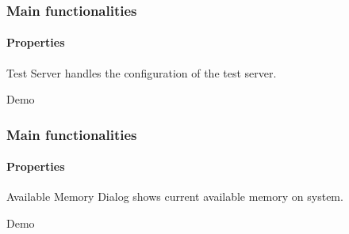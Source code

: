 \begin{frame}
\frametitle{Main functionalities}
\framesubtitle{Properties}
\label{concept:test-server}

\begin{block}{Test Server}
 handles the configuration of the test server.
\end{block}

\begin{block}{Demo}
\end{block}
\end{frame}


\begin{frame}
\frametitle{Main functionalities}
\framesubtitle{Properties}
\label{concept:available-memory-dialog}

\begin{block}{Available Memory Dialog}
 shows current available memory on system.
\end{block}

\begin{block}{Demo}
\end{block}
\end{frame}
